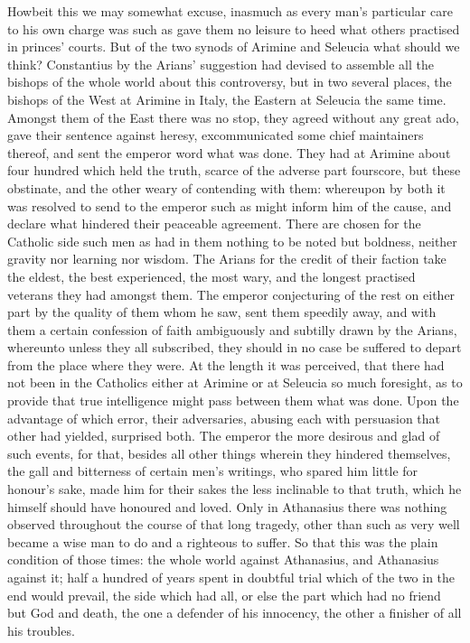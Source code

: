 Howbeit this we may somewhat excuse, inasmuch as every man’s particular care to his own charge was such as gave them no leisure to heed what others practised in princes’ courts. But of the two synods of Arimine and Seleucia what should we think? Constantius by the Arians’ suggestion had devised to assemble all the bishops of the whole world about this controversy, but in two several places, the bishops of the  West at Arimine in Italy, the Eastern at Seleucia the same time. Amongst them of the East there was no stop, they agreed without any great ado, gave their sentence against heresy, excommunicated some chief maintainers thereof, and sent the emperor word what was done. They had at Arimine about four hundred which held the truth, scarce of the adverse part fourscore, but these obstinate, and the other weary of contending with them: whereupon by both it was resolved to send to the emperor such as might inform him of the cause, and declare what hindered their peaceable agreement. There are chosen for the Catholic side such men as had in them nothing to be noted but boldness, neither gravity nor learning nor wisdom. The Arians for the credit of their faction take the eldest, the best experienced, the most wary, and the longest practised veterans they had amongst them. The emperor conjecturing of the rest on either part by the quality of them whom he saw, sent them speedily away, and with them a certain confession of faith ambiguously and subtilly drawn by the Arians, whereunto unless they all subscribed, they should in no case be suffered to depart from the place where they were. At the length it was perceived, that there had not been in the Catholics either at Arimine or at Seleucia so much foresight, as to provide that true intelligence might pass between them what was done. Upon the advantage of which error, their adversaries, abusing each with persuasion that other had yielded, surprised both. The emperor the more desirous and glad of such events, for that, besides all other things wherein they hindered themselves, the gall and bitterness of certain men’s writings, who spared him little for honour’s sake, made him for their sakes the less inclinable to that truth, which he himself should have honoured and loved.
Only in Athanasius there was nothing observed throughout the course of that long tragedy, other than such as very well became a wise man to do and a righteous to suffer. So that  this was the plain condition of those times: the whole world against Athanasius, and Athanasius against it; half a hundred of years spent in doubtful trial which of the two in the end would prevail, the side which had all, or else the part which had no friend but God and death, the one a defender of his innocency, the other a finisher of all his troubles.
